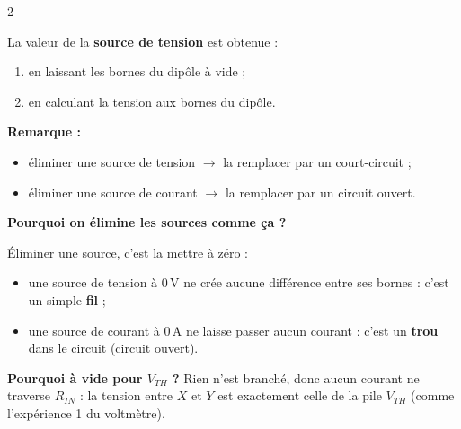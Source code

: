 \documentclass[a4paper,9pt]{extarticle}
\begin{document}
\begin{multicols}{2}
\begin{enumerate}[leftmargin=*,itemsep=1pt,topsep=1pt]
\end{enumerate}

La valeur de la \textbf{source de tension} est obtenue :

\begin{enumerate}[leftmargin=*,itemsep=1pt,topsep=1pt]

\item en laissant les bornes du dipôle à vide ;

\item en calculant la tension aux bornes du dipôle.

\end{enumerate}


\begin{warning}

\textbf{Remarque :}

\begin{itemize}

\item éliminer une source de tension $\rightarrow$ la remplacer par un court-circuit ;

\item éliminer une source de courant $\rightarrow$ la remplacer par un circuit ouvert.

\end{itemize}

\end{warning}


\begin{important}

\textbf{Pourquoi on élimine les sources comme ça ?}

\og Éliminer \fg{} une source, c'est la mettre à zéro :

\begin{itemize}

\item une source de tension à $0\,\text{V}$ ne crée aucune différence entre ses bornes : c'est un simple \textbf{fil} ;

\item une source de courant à $0\,\text{A}$ ne laisse passer aucun courant : c'est un \textbf{trou} dans le circuit (circuit ouvert).

\end{itemize}

\textbf{Pourquoi \og à vide \fg{} pour $V_{TH}$ ?} Rien n'est branché, donc aucun courant ne traverse $R_{IN}$ : la tension entre $X$ et $Y$ est exactement celle de la pile $V_{TH}$ (comme l'expérience 1 du voltmètre).


\end{important}
\end{multicols}
\end{document}
